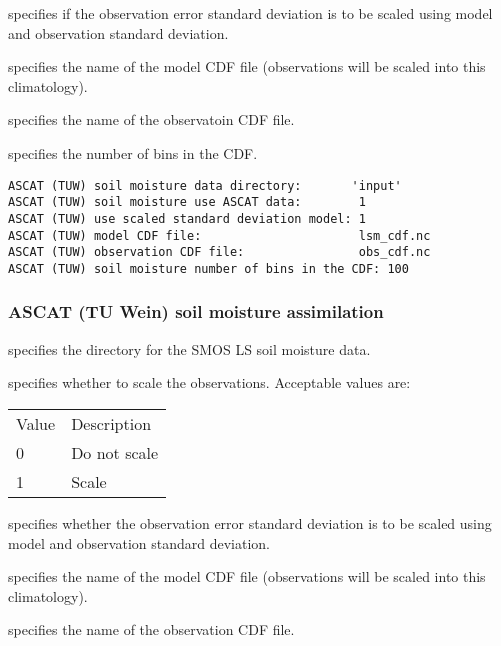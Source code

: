   specifies if
 the observation error standard deviation is to be scaled using
 model and observation standard deviation.

  specifies the
 name of the model CDF file (observations will be scaled into this
 climatology).

  specifies the
 name of the observatoin CDF file.

  specifies
 the number of bins in the CDF.
 

 \begin{Verbatim}[frame=single]
ASCAT (TUW) soil moisture data directory:       'input'
ASCAT (TUW) soil moisture use ASCAT data:        1
ASCAT (TUW) use scaled standard deviation model: 1
ASCAT (TUW) model CDF file:                      lsm_cdf.nc
ASCAT (TUW) observation CDF file:                obs_cdf.nc
ASCAT (TUW) soil moisture number of bins in the CDF: 100
 \end{Verbatim}
 

 
 
 \subsubsection{ASCAT (TU Wein) soil moisture assimilation}
 \label{sssec:ascattuwsmda}
 

 
  specifies the directory
 for the SMOS LS soil moisture data.

  specifies whether to scale
 the observations.
 Acceptable values are: 

 \begin{tabular}{ll}
 Value & Description  \\
 0     & Do not scale \\
 1     & Scale        \\
 \end{tabular}

  specifies whether
 the observation error standard deviation is to be scaled using
 model and observation standard deviation.

  specifies the name of the model CDF
 file (observations will be scaled into this climatology).

  specifies the name of the
 observation CDF file.

